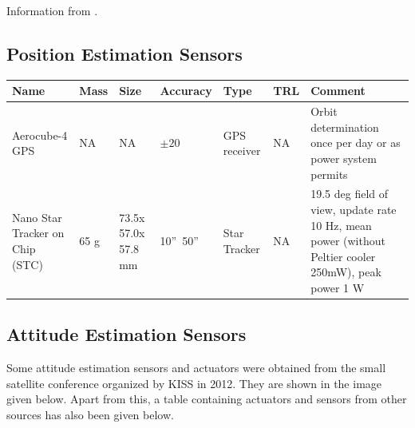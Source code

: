 
Information from \cite{imu2}.

\subsection{Position Estimation Sensors}
\begin{center}

     \begin{tabular}{ |p{2cm} | p{1cm} | p{2cm} | l | l | l | p{5cm} |}
     \hline

      {\bf Name} & {\bf Mass} & {\bf Size} & {\bf Accuracy} & {\bf Type} & {\bf TRL} & {\bf Comment}  \\ \hline

     Aerocube-4 GPS \cite{Gangestad} & NA & NA &  {$ \pm 20 $} & GPS receiver & NA & Orbit determination once per day or as power system permits \\ \hline

     Nano Star Tracker on Chip (STC) \cite{Prokhorov} & 65 g & 73.5x 57.0x 57.8 mm & 10''~50'' & Star Tracker & NA & 19.5 deg field of view, update rate 10 Hz, mean power (without Peltier cooler 250mW), peak power 1 W \\ \hline
     \end{tabular}
\end{center}

\subsection{Attitude Estimation Sensors}
Some attitude estimation sensors and actuators were obtained from the small satellite conference organized by KISS in 2012. They are shown in the image given below.  Apart from this, a table containing actuators and sensors from other sources has also been given below. 

